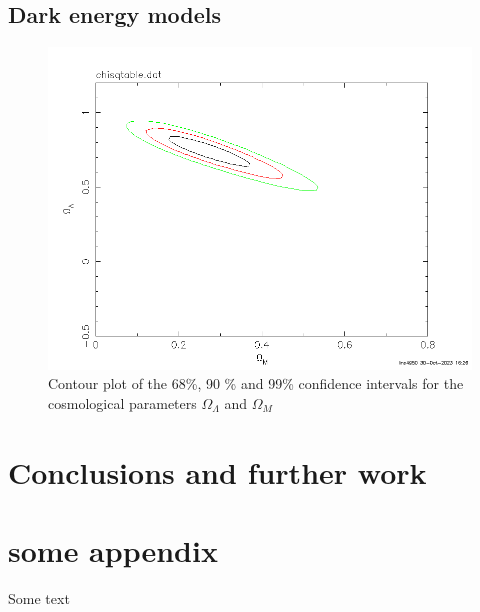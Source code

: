 \documentclass[11pt]{article}
\begin{document}
\subsection{Dark energy models}
\begin{figure}[htbp]
	\centering
	\includegraphics[width=0.8\linewidth]{dark.png}
	\caption{Contour plot of the 68\%, 90 \% and 99\% confidence intervals for the cosmological parameters $\Omega_\Lambda$ and $\Omega_M$}
	\label{fig:dark}
\end{figure}

\section{Conclusions and further work}




\newpage

\appendix
\section{some appendix} 
Some text
\end{document}
